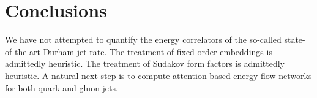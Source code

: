 \section{Conclusions}\label{sec:conclusions}

We have not attempted to quantify the energy correlators of the
so-called state-of-the-art Durham jet rate. The treatment of fixed-order
embeddings is admittedly heuristic. The treatment of Sudakov form
factors is admittedly heuristic. A natural next step is to compute
attention-based energy flow networks for both quark and gluon jets.

